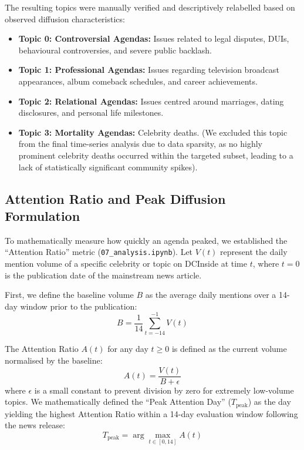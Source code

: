 \documentclass[9pt,twoside,lineno]{pnas-new}
\begin{document}
\begin{article}
The resulting topics were manually verified and descriptively relabelled based on observed diffusion characteristics:
\begin{itemize}
    \item \textbf{Topic 0: Controversial Agendas:} Issues related to legal disputes, DUIs, behavioural controversies, and severe public backlash.
    \item \textbf{Topic 1: Professional Agendas:} Issues regarding television broadcast appearances, album comeback schedules, and career achievements.
    \item \textbf{Topic 2: Relational Agendas:} Issues centred around marriages, dating disclosures, and personal life milestones.
    \item \textbf{Topic 3: Mortality Agendas:} Celebrity deaths. (We excluded this topic from the final time-series analysis due to data sparsity, as no highly prominent celebrity deaths occurred within the targeted subset, leading to a lack of statistically significant community spikes).
\end{itemize}

\subsection*{Attention Ratio and Peak Diffusion Formulation}
To mathematically measure how quickly an agenda peaked, we established the ``Attention Ratio'' metric (\texttt{07\_analysis.ipynb}). Let $V(t)$ represent the daily mention volume of a specific celebrity or topic on DCInside at time $t$, where $t=0$ is the publication date of the mainstream news article.

First, we define the baseline volume $B$ as the average daily mentions over a 14-day window prior to the publication:
\begin{equation}
B = \frac{1}{14} \sum_{t=-14}^{-1} V(t)
\end{equation}

The Attention Ratio $A(t)$ for any day $t \geq 0$ is defined as the current volume normalised by the baseline:
\begin{equation}
A(t) = \frac{V(t)}{B + \epsilon}
\end{equation}
where $\epsilon$ is a small constant to prevent division by zero for extremely low-volume topics. We mathematically defined the ``Peak Attention Day'' ($T_{\text{peak}}$) as the day yielding the highest Attention Ratio within a 14-day evaluation window following the news release:
\begin{equation}
T_{\text{peak}} = \arg\max_{t \in [0, 14]} A(t)
\end{equation}


\end{article}
\end{document}
